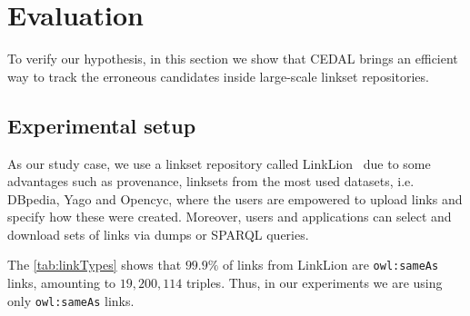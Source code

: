 
\section{Evaluation} \label{evaluation}

To verify our hypothesis, in this section we show that CEDAL brings an efficient way to track the erroneous candidates inside large-scale linkset repositories. 

\subsection{Experimental setup}
As our study case, we use a linkset repository called LinkLion~\cite{nentwig2014linklion} due to some advantages such as provenance, linksets from the most used datasets, i.e. DBpedia, Yago and Opencyc, where the users are empowered to upload links and specify how these were created. Moreover, users and applications can select and download sets of links via dumps or SPARQL queries. 

The \cref{tab:linkTypes} shows that $99.9 \%$ of links from LinkLion are \texttt{owl:sameAs} links, amounting to $19,200,114$ triples. Thus, in our experiments we are using only \texttt{owl:sameAs} links. 

